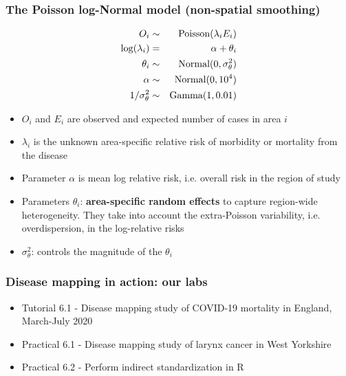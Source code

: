 \documentclass[12pt]{beamer}
\begin{document}
\begin{frame}
    \frametitle{The Poisson log-Normal model (non-spatial smoothing)}
\vspace{-10pt}
\footnotesize{
\begin{eqnarray*}
O_i & \sim & \hbox{Poisson}(\lambda_i E_i) \\
\log(\lambda_i) & = & \alpha + \theta_i\\
\theta_i & \sim  & \hbox{Normal}(0, \sigma_{\theta}^2) \\
\alpha &\sim & \hbox{Normal}(0,10^4)\\
1/\sigma^2_{\theta} &\sim &\text{Gamma}(1, 0.01)\\
\end{eqnarray*}
}
\vspace{-10pt}
{\footnotesize
\begin{itemize}\setlength\itemsep{\fill}
\item $O_i$ and $E_i$ are observed and expected number of cases in area $i$
\item $\lambda_i$ is the unknown area-specific relative risk of morbidity or mortality from the disease
 \item Parameter $\alpha$ is mean log relative risk, i.e. overall risk in the region of study
\item  Parameters $\theta_i$: {\bf area-specific random effects} to capture region-wide heterogeneity. They take into account the extra-Poisson variability, i.e.  \alert{overdispersion}, in the log-relative risks %
  \item $\sigma_{\theta}^2$: controls the magnitude of the $\theta_i$ %
\end{itemize}
}
\end{frame}


\begin{frame}
\frametitle{Disease mapping in action: our labs}
\begin{itemize} \setlength\itemsep{\fill}
  \item Tutorial 6.1 - Disease mapping study of COVID-19 mortality in England, March-July 2020
  \item Practical 6.1 - Disease mapping study of larynx cancer in West Yorkshire
  \item Practical 6.2 - Perform indirect standardization in R
\end{itemize}
\end{frame}
\end{document}
